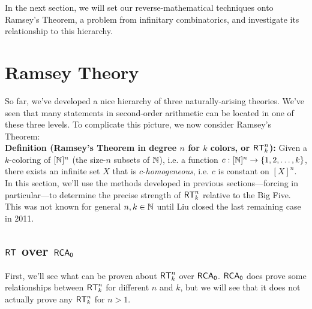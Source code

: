 \documentclass{amsart}
\begin{document}
	In the next section, we will set our reverse-mathematical techniques onto Ramsey's Theorem, a problem from infinitary combinatorics, and investigate its relationship to this hierarchy.
	
	\newpage
	
	\section{Ramsey Theory}
	
	So far, we've developed a nice hierarchy of three naturally-arising theories. We've seen that many statements in second-order arithmetic can be located in one of these three levels. To complicate this picture, we now consider Ramsey's Theorem:\\
	
	\noindent \textbf{Definition (Ramsey's Theorem in degree $n$ for $k$ colors, or $\operatorname{\sf{RT}}_k^n$):} Given a $k$-coloring of $[\mathbb{N}]^n$ (the size-$n$ subsets of $\mathbb{N}$), i.e. a function $c:[\mathbb{N}]^n\to \{1,2,\dots,k\}$, there exists an infinite set $X$ that is $c$-\textit{homogeneous}, i.e. $c$ is constant on $[X]^n$.\\
	
	In this section, we'll use the methods developed in previous sections---forcing in particular---to determine the precise strength of $\operatorname{\sf{RT}}^n_k$ relative to the Big Five. This was not known for general $n,k\in \mathbb{N}$ until Liu closed the last remaining case in 2011.
	
	\subsection{\texorpdfstring{$\operatorname{\sf{RT}}$ over $\operatorname{\sf{RCA_0}}$}{RT over RCA}} First, we'll see what can be proven about $\operatorname{\sf{RT}}^n_k$ over $\operatorname{\sf{RCA_0}}$. $\operatorname{\sf{RCA_0}}$ does prove some relationships between $\operatorname{\sf{RT}}^n_k$ for different $n$ and $k$, but we will see that it does not actually prove any $\operatorname{\sf{RT}}^n_k$ for $n>1$.\\
	
\end{document}

